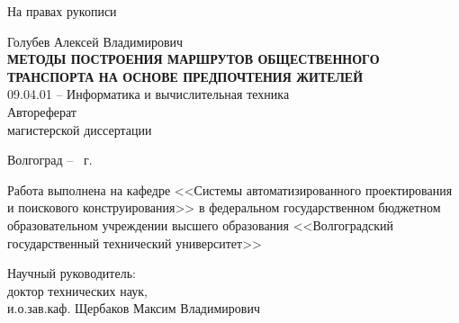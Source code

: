 \documentclass[a5paper, 10pt]{article}
\begin{document}
    \begin{titlepage}
        \hspace{15em}На правах рукописи\\
        \begin{center}
            \vspace{8em}Голубев Алексей Владимирович\\
            \large\vspace{2em}\textbf{\MakeUppercase{Методы построения маршрутов общественного 
                транспорта на основе предпочтения жителей}}\normalsize\\
            \vspace{8em}09.04.01 -- Информатика и вычислительная техника\\
            \vspace{8em}Автореферат\\магистерской диссертации
        \end{center}
        \vfill
        \begin{center}
            Волгоград -- \the\year\ г.
        \end{center}
        \newpage
        \thispagestyle{empty}
        Работа выполнена на кафедре <<Системы автоматизированного проектирования и поискового 
        конструирования>> в федеральном государственном бюджетном образовательном учреждении 
        высшего образования <<Волгоградский государственный технический университет>>\\
        \vspace{3em}\begin{flushleft}
            Научный руководитель:\\
            \hspace{2cm}доктор технических наук,\\
            \hspace{2cm}и.о.зав.каф. Щербаков Максим Владимирович\\
        \end{flushleft}
    \end{titlepage}
    \newpage
    \onehalfspacing
    \setcounter{page}{3}
    
\end{document}
